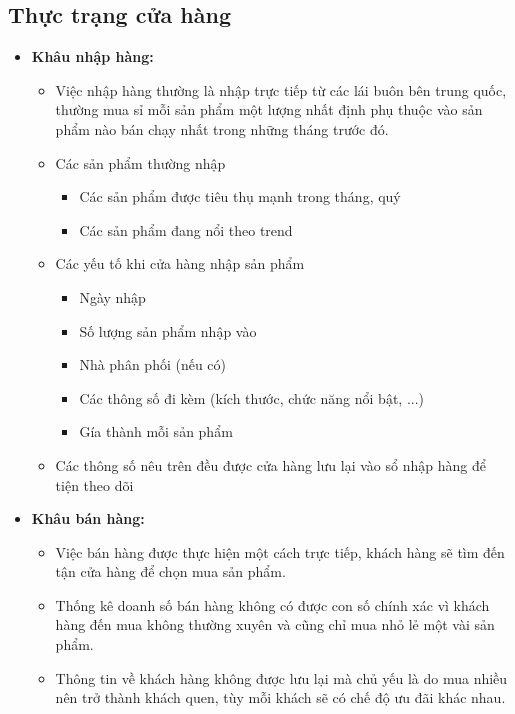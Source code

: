 \subsection{Thực trạng cửa hàng}
\begin{itemize}
    \item\textbf{Khâu nhập hàng:}\par
    \vspace{-1em}
    \begin{itemize}
        \item Việc nhập hàng thường là nhập trực tiếp từ các lái buôn bên trung quốc, thường mua sỉ mỗi sản phẩm một lượng nhất định phụ thuộc vào sản phẩm nào bán chạy nhất trong những tháng trước đó.
        \item Các sản phẩm thường nhập
            \begin{itemize}
                \item Các sản phẩm được tiêu thụ mạnh trong tháng, quý
                \item Các sản phẩm đang nổi theo trend
            \end{itemize}
        \item Các yếu tố khi cửa hàng nhập sản phẩm
            \begin{itemize}
                \item Ngày nhập
                \item Số lượng sản phẩm nhập vào
                \item Nhà phân phối (nếu có)
                \item Các thông số đi kèm (kích thước, chức năng nổi bật, ...)
                \item Gía thành mỗi sản phẩm
            \end{itemize}
        \item Các thông số nêu trên đều được cửa hàng lưu lại vào sổ nhập hàng để tiện theo dõi
    \end{itemize}
    \item\textbf{Khâu bán hàng:}\par
        \begin{itemize}
        \item Việc bán hàng được thực hiện một cách trực tiếp, khách hàng sẽ tìm đến tận cửa hàng để chọn mua sản phẩm.
        \item Thống kê doanh số bán hàng không có được con số chính xác vì khách hàng đến mua không thường xuyên và cũng chỉ mua nhỏ lẻ một vài sản phẩm.
        \item Thông tin về khách hàng không được lưu lại mà chủ yếu là do mua nhiều nên trở thành khách quen, tùy mỗi khách sẽ có chế độ ưu đãi khác nhau.

\end{itemize}
\end{itemize}
